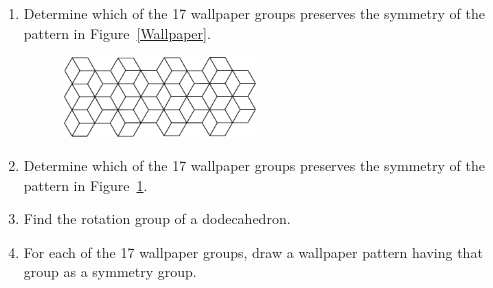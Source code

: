 {\begin{enumerate}
\begin{itemize}
 \item
$H \cap N = \{ id \}$;
 
 \item
$HN=G$.
 
\end{itemize}
Show that each of the following is true.
\begin{enumerate}
 
 \bf\item\rm
$S_3$ is the semidirect product of $A_3$ by $H = \{(1), (12) \}$.
 
 \bf\item\rm
The quaternion group, $Q_8$, cannot be written as a semidirect product. 
 
 \bf\item\rm
$E(2)$ is the semidirect product of $O(2)$ by $H$, where $H$ consists
of all translations in ${\Bbb R}^2$. 
 
\end{enumerate}
 
 
 
\bf\item\rm
Determine which of the 17 wallpaper groups preserves the symmetry of
the pattern in Figure~\ref{Wallpaper}.  
 
\begin{figure}[htb]
\begin{center}
\centerline {
\includegraphics[width=2in]{p6m}
}
\end{center}
\caption{}
\label{For17}
\end{figure}
 
\bf\item\rm
Determine which of the 17 wallpaper groups preserves the symmetry of
the pattern in Figure~\ref{For17}.  
 
 
 
\bf\item\rm
Find the rotation group of a dodecahedron.
 
  
 
\bf\item\rm
For each of the 17 wallpaper groups, draw a wallpaper pattern having
that group as a symmetry group.  
 
\end{enumerate}
}
 
